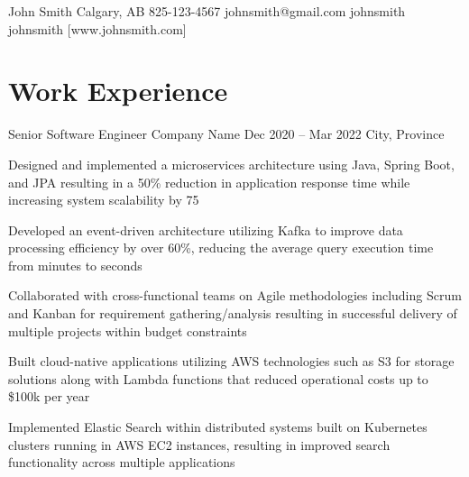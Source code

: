 \documentclass[letterpaper]{resume_config}
\begin{document}
\Header
    {John Smith} %
    {Calgary, AB} %
    {825-123-4567} %
    {johnsmith@gmail.com} %
    {johnsmith} %
    {johnsmith} %
    [www.johnsmith.com] %


\section{Work Experience}

\WorkExperience
    {Senior Software Engineer} %
    {Company Name} %
    {Dec 2020 -- Mar 2022} %
    {City, Province} %
    {
        \item Designed and implemented a microservices architecture using Java, Spring Boot, and JPA resulting in a 50\% reduction in application response time while increasing system scalability by 75%
        \item Developed an event-driven architecture utilizing Kafka to improve data processing efficiency by over 60\%, reducing the average query execution time from minutes to seconds
        \item Collaborated with cross-functional teams on Agile methodologies including Scrum and Kanban for requirement gathering/analysis resulting in successful delivery of multiple projects within budget constraints
        \item Built cloud-native applications utilizing AWS technologies such as S3 for storage solutions along with Lambda functions that reduced operational costs up to \$100k per year
        \item Implemented Elastic Search within distributed systems built on Kubernetes clusters running in AWS EC2 instances, resulting in improved search functionality across multiple applications
    } 
\end{document}
